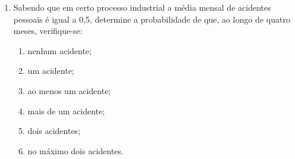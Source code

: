 \begin{enumerate}[resume]
\item Sabendo que em certo processo industrial a média mensal de acidentes pessoais é igual a 0,5, determine a probabilidade de que, ao longo de quatro meses, verifique-se:
	\begin{enumerate}
	\item nenhum acidente;
	\item um acidente;
	\item ao menos um acidente;
	\item mais de um acidente;
	\item dois acidentes;
	\item no máximo dois acidentes.	
	\end{enumerate}	
	
\end{enumerate}	
